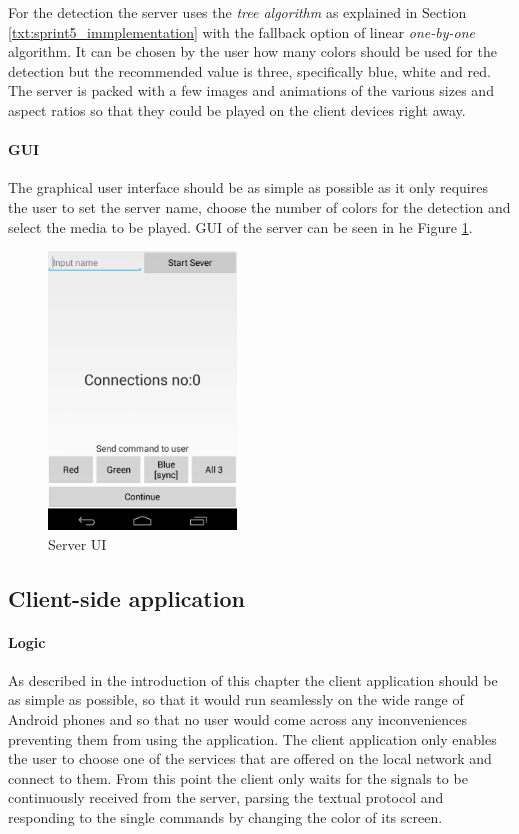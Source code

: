 For the detection the server uses the \textit{tree algorithm} as explained in Section \ref{txt:sprint5_immplementation} with the fallback option of linear \textit{one-by-one} algorithm. It can be chosen by the user how many colors should be used for the detection but the recommended value is three, specifically blue, white and red. The server is packed with a few images and animations of the various sizes and aspect ratios so that they could be played on the client devices right away.

\paragraph{GUI}
The graphical user interface should be as simple as possible as it only requires the user to set the server name, choose the number of colors for the detection and select the media to be played. GUI of the server can be seen in he Figure \ref{fig:Server_UI}.

\begin{figure}[H]
	\centering
		\includegraphics[width=5cm]{conclusion/server_ui.png}
	\caption{Server UI}
	\label{fig:Server_UI}
\end{figure}

\subsection{Client-side application}

\paragraph{Logic} 
As described in the introduction of this chapter the client application should be as simple as possible, so that it would run seamlessly on the wide range of Android phones and so that no user would come across any inconveniences preventing them from using the application. The client application only enables the user to choose one of the services that are offered on the local network and connect to them. From this point the client only waits for the signals to be continuously received from the server, parsing the textual protocol and responding to the single commands by changing the color of its screen.

